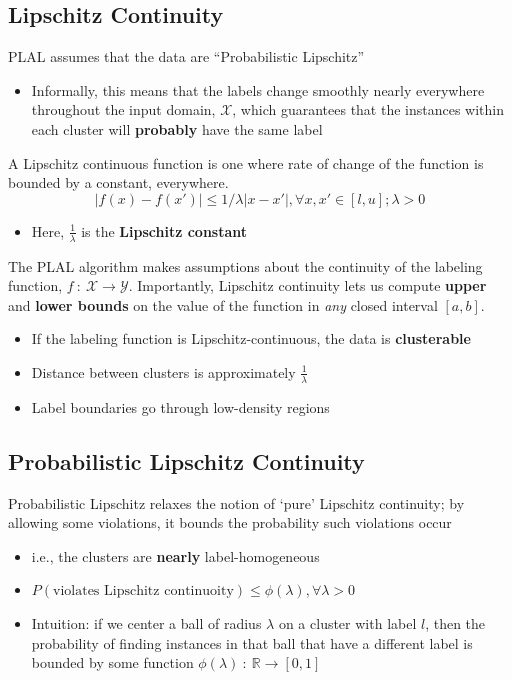 \documentclass[10pt]{article}
\begin{document}
\subsection*{Lipschitz Continuity}
PLAL assumes that the data are ``Probabilistic Lipschitz''
\begin{itemize}
	\item Informally, this means that the labels change smoothly nearly everywhere throughout the input domain, $\mathcal{X}$, which guarantees that the instances within each cluster will \textbf{probably} have the same label
\end{itemize}
A Lipschitz continuous function is one where rate of change of the function is bounded by a constant, everywhere.
\[|f(x) - f(x')| \leq 1 / \lambda |x - x'|, \forall x, x' \in [l, u]; \lambda > 0\]
\begin{itemize}
	\item Here, $\frac{1}{\lambda}$ is the \textbf{Lipschitz constant}
\end{itemize}
The PLAL algorithm makes assumptions about the continuity of the labeling function, $f\::\: \mathcal{X} \rightarrow \mathcal{Y}$.  Importantly, Lipschitz continuity lets us compute \textbf{upper} and \textbf{lower bounds} on the value of the function in \textit{any} closed interval $[a, b]$.
\begin{itemize}
	\item If the labeling function is Lipschitz-continuous, the data is \textbf{clusterable}
	\item Distance between clusters is approximately $\frac{1}{\lambda}$
	\item Label boundaries go through low-density regions
\end{itemize}

\subsection*{Probabilistic Lipschitz Continuity}
Probabilistic Lipschitz relaxes the notion of `pure' Lipschitz continuity; by allowing some violations, it bounds the probability such violations occur
\begin{itemize}
	\item i.e., the clusters are \textbf{nearly} label-homogeneous
	\item $P(\text{violates Lipschitz continuoity}) \leq \phi(\lambda), \forall \lambda > 0$
	\item Intuition: if we center a ball of radius $\lambda$ on a cluster with label $l$, then the probability of finding instances in that ball that have a different label is bounded by some function $\phi(\lambda) \::\: \mathbb{R} \rightarrow [0, 1]$
\end{itemize}
\end{document}
